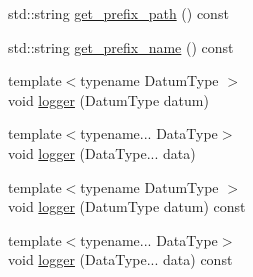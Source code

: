 \begin{DoxyCompactItemize}
std\+::string \mbox{\hyperlink{classbfl_1_1Logger_a56cf1a4e712bf23d9978420a8a59a62b}{get\+\_\+prefix\+\_\+path}} () const
\item 
std\+::string \mbox{\hyperlink{classbfl_1_1Logger_a913a795b7bfbf378815eeb342d68a7c0}{get\+\_\+prefix\+\_\+name}} () const
\item 
{\footnotesize template$<$typename Datum\+Type $>$ }\\void \mbox{\hyperlink{classbfl_1_1Logger_a1033ff31398484f2132f84fd140da9e3}{logger}} (Datum\+Type datum)
\item 
{\footnotesize template$<$typename... Data\+Type$>$ }\\void \mbox{\hyperlink{classbfl_1_1Logger_aca2086c9256e5c404872b91f7f25b97d}{logger}} (Data\+Type... data)
\item 
{\footnotesize template$<$typename Datum\+Type $>$ }\\void \mbox{\hyperlink{classbfl_1_1Logger_a50b1c109730fa98f66e66f420f0158fe}{logger}} (Datum\+Type datum) const
\item 
{\footnotesize template$<$typename... Data\+Type$>$ }\\void \mbox{\hyperlink{classbfl_1_1Logger_a0f0cf7ce956546d94dfb1feb7cebf171}{logger}} (Data\+Type... data) const
\end{DoxyCompactItemize}
